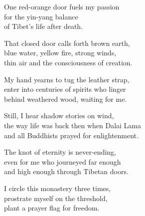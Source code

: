 \documentclass[twoside,10pt]{book}
\begin{document}
One red-orange door fuels my passion\\
for the yin-yang balance\\
of Tibet's life after death.

That closed door calls forth brown earth,\\
blue water, yellow fire, strong winds,\\
thin air and the consciousness of creation.

My hand yearns to tug the leather strap,\\
enter into centuries of spirits who linger\\
behind weathered wood, waiting for me.

Still, I hear shadow stories on wind,\\
the way life was back then when Dalai Lama\\
and all Buddhists prayed for enlightenment.

The knot of eternity is never-ending,\\
even for me who journeyed far enough\\
and high enough through Tibetan doors.

I circle this monastery three times,\\
prostrate myself on the threshold,\\
plant a prayer flag for freedom.

\clearpage
\pagestyle{empty}
\cleardoublepage
\mbox{ }

\clearpage

\mbox{ }

\cleardoublepage
\mbox{ }
\clearpage
\mbox{ }
\end{document}
